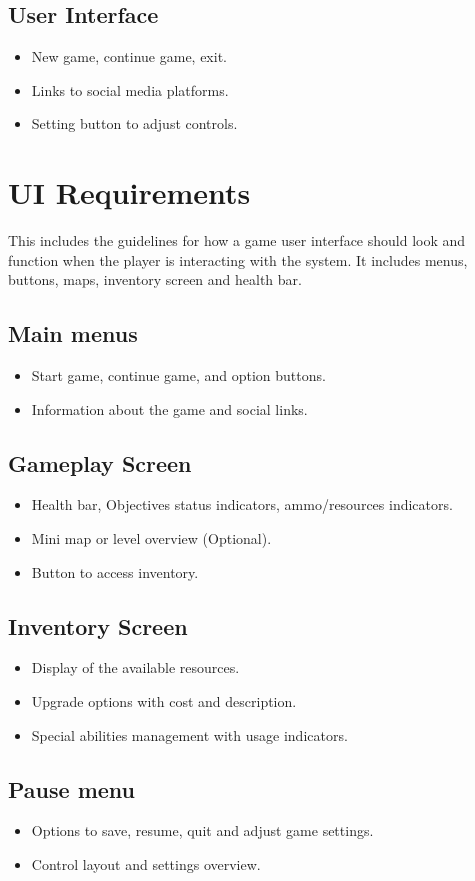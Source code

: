 \subsection{User Interface}
\begin{itemize}
	\item 	New game, continue game, exit.
	\item 	Links to social media platforms.
	\item 	Setting button to adjust controls.
\end{itemize}
\section{UI Requirements}
This includes the guidelines for how a game user interface should look and function when the player is interacting with the system. It includes menus, buttons, maps, inventory screen and health bar.
\subsection{Main menus}
\begin{itemize}
	\item	Start game, continue game, and option buttons.
	\item	Information about the game and social links.
\end{itemize}
\subsection{Gameplay Screen}
\begin{itemize}
	\item 	Health bar, Objectives status indicators, ammo/resources indicators.
	\item 	Mini map or level overview (Optional).
	\item 	Button to access inventory.
\end{itemize}
\subsection{Inventory Screen}
\begin{itemize}
	\item	Display of the available resources.
	\item 	Upgrade options with cost and description.
	\item 	Special abilities management with usage indicators.
\end{itemize}
\subsection{Pause menu}
\begin{itemize}
	\item 	Options to save, resume, quit and adjust game settings.
	\item 	Control layout and settings overview.
\end{itemize}

